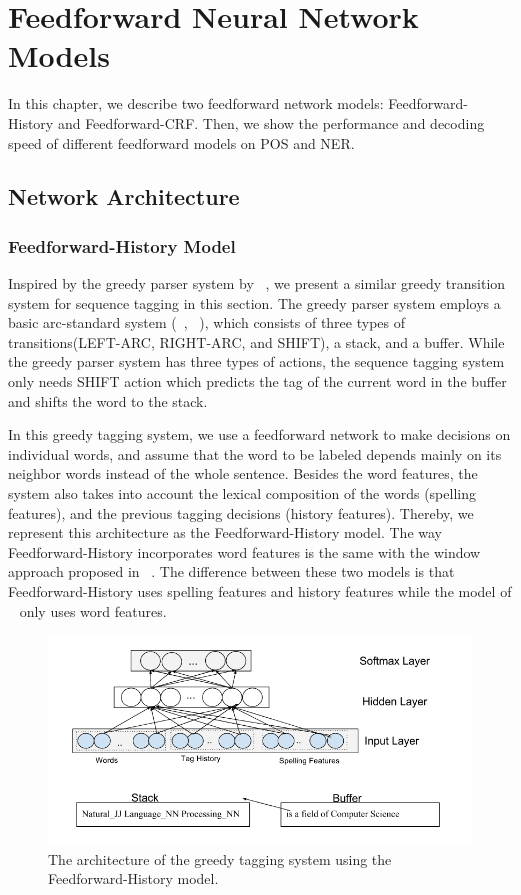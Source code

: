 
\chapter{Feedforward Neural Network Models}

In this chapter, we describe two feedforward network models: Feedforward-History and Feedforward-CRF. Then, we show the performance and decoding speed of different feedforward models on POS and NER. 

\section{Network Architecture}

\subsection{Feedforward-History Model}

Inspired by the greedy parser system by ~\cite{chen2014fast}, we present a similar greedy transition system for sequence tagging in this section. The greedy parser system employs a basic arc-standard system (~\citeauthor{nivre2004deterministic}, ~\citeyear{nivre2004deterministic}), which consists of three types of transitions(LEFT-ARC, RIGHT-ARC, and SHIFT), a stack, and a buffer. While the greedy parser system has three types of actions, the sequence tagging system only needs SHIFT action which predicts the tag of the current word in the buffer and shifts the word to the stack. 

In this greedy tagging system, we use a feedforward network to make decisions on individual words, and assume that the word to be labeled depends mainly on its neighbor words instead of the whole sentence. Besides the word features, the system also takes into account the lexical composition of the words (spelling features), and the previous tagging decisions (history features). Thereby, we represent this architecture as the Feedforward-History model. The way Feedforward-History incorporates word features is the same with the window approach proposed in ~\cite{collobert2011natural}. The difference between these two models is that Feedforward-History uses spelling features and history features while the model of ~\cite{collobert2011natural} only uses word features.

\begin{figure}
  \centering
  \includegraphics[scale=0.6]{greedypos.png}
 \caption{The architecture of the greedy tagging system using the Feedforward-History model.}
  \label{fig:greedypos}
\end{figure}

